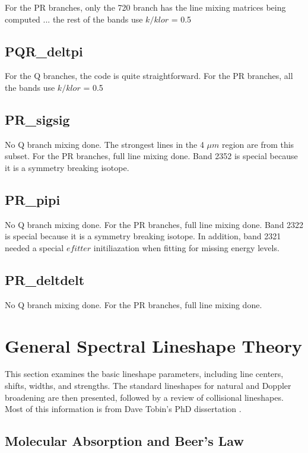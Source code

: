 \documentclass[11pt]{article}
\begin{document}
For the PR branches, only the 720 branch has the line mixing matrices being
computed ... the rest of the bands use $k/klor$ = 0.5

\subsection{PQR\_deltpi}
For the Q branches, the code is quite straightforward. For the PR branches,
all the bands use $k/klor$ = 0.5

\subsection{PR\_sigsig}
No Q branch mixing done. The strongest lines in the 4 $\mu m$ region are 
from this subset. For the PR branches, full line mixing done. Band 2352 is 
special because it is a symmetry breaking isotope.

\subsection{PR\_pipi}
No Q branch mixing done. For the PR branches, full line mixing done. Band 
2322 is special because it is a symmetry breaking isotope. In addition, 
band 2321 needed a special $efitter$ initiliazation when fitting for 
missing energy levels.

\subsection{PR\_deltdelt}
No Q branch mixing done. For the PR branches, full line mixing done. 

\newpage

\section{General Spectral Lineshape Theory}\label{chpt:shapes}

This section examines the basic lineshape parameters,
including line centers, shifts, widths, and strengths.  The standard 
lineshapes for natural and Doppler broadening are then presented, followed 
by a review of collisional lineshapes. Most of this information 
is from Dave Tobin's PhD dissertation \cite{tob:96}.

\subsection{Molecular Absorption and Beer's Law}\label{sec:beerslaw}
\end{document}
